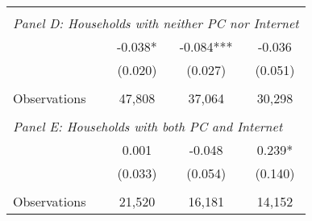 {\begin{tabular}{lccc}
&  &  &   \\
\multicolumn{4}{l}{\textit{Panel D: Households with neither PC nor Internet}} \\
\hspace{3mm}        &      -0.038*  &      -0.084***&      -0.036   \\
                    &     (0.020)   &     (0.027)   &     (0.051)   \\
                    &               &               &               \\
\hspace{3mm}Observations&      47,808   &      37,064   &      30,298   \\
 
&  &  &   \\
\multicolumn{4}{l}{\textit{Panel E: Households with both PC and Internet}} \\
\hspace{3mm}        &       0.001   &      -0.048   &       0.239*  \\
                    &     (0.033)   &     (0.054)   &     (0.140)   \\
                    &               &               &               \\
\hspace{3mm}Observations&      21,520   &      16,181   &      14,152   \\
 

\bottomrule
\end{tabular}
}
